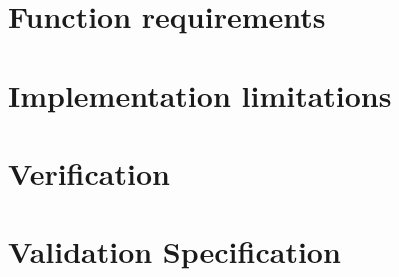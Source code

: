 \documentclass[../../main.tex]{subfiles}
\begin{document}
\section{Function requirements}%
\label{sec:function_requirements}


\section{Implementation limitations}%
\label{sec:implementation_limitations}


\section{Verification}%
\label{sec:verification}


\section{Validation Specification}%
\label{sec:validation_specification}


	
\end{document}

